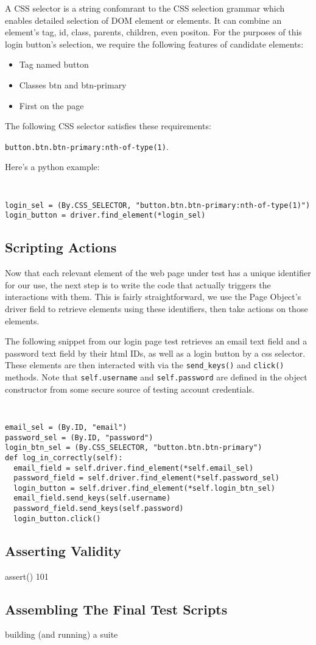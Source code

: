 A CSS selector is a string confomrant to the CSS selection grammar \citep{Selector54} which enables detailed selection of DOM element or elements. It can combine an element's tag, id, class, parents, children, even positon. For the purposes of this login button's selection, we require the following features of candidate elements:
\begin{itemize}
\item Tag named button
\item Classes btn and btn-primary
\item First on the page
\end{itemize}

The following CSS selector satisfies these requirements:

\texttt{button.btn.btn-primary:nth-of-type(1)}.

Here's a python example:
{\tt
\begin{verbatim}
login_sel = (By.CSS_SELECTOR, "button.btn.btn-primary:nth-of-type(1)")
login_button = driver.find_element(*login_sel)
\end{verbatim}
}


\subsection{Scripting Actions}
Now that each relevant element of the web page under test has a unique identifier for our use, the next step is to write the code that actually triggers the interactions with them. This is fairly straightforward, we use the Page Object's driver field to retrieve elements using these identifiers, then take actions on those elements.

The following snippet from our login page test retrieves an email text field and a password text field by their html IDs, as well as a login button by a css selector. These elements are then interacted with via the \texttt{send\_keys()} and \texttt{click()} methods. Note that \texttt{self.username} and \texttt{self.password} are defined in the object constructor from some secure source of testing account credentials.

{\tt
\begin{verbatim}
email_sel = (By.ID, "email")
password_sel = (By.ID, "password")
login_btn_sel = (By.CSS_SELECTOR, "button.btn.btn-primary")
def log_in_correctly(self):
  email_field = self.driver.find_element(*self.email_sel)
  password_field = self.driver.find_element(*self.password_sel)
  login_button = self.driver.find_element(*self.login_btn_sel)
  email_field.send_keys(self.username)
  password_field.send_keys(self.password)
  login_button.click()
\end{verbatim}
}

\subsection{Asserting Validity}
assert() 101

\subsection{Assembling The Final Test Scripts}
building (and running) a suite
